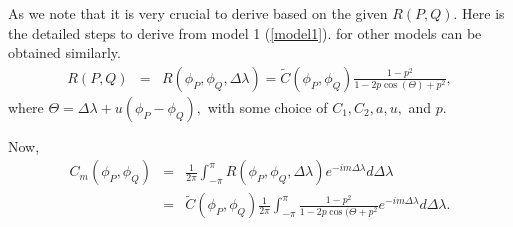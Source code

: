 
%
%

As we note that it is very crucial to derive \Cm based on the given $R(P,Q)$. Here is the detailed steps to derive \Cm from model 1 (\ref{model1}). \Cm for other models can be obtained similarly. 
\begin{eqnarray*}
	R(P, Q) &=& R(\phi_P, \phi_Q, \Delta \lambda) = \tilde{C}(\phi_P, \phi_Q) \frac{1-p^2}{1 - 2p \cos(\Theta)+p^2},
\end{eqnarray*}
where $\Theta = \Delta \lambda + u(\phi_P - \phi_Q),$ with some choice of $C_1, C_2, a, u,$ and $p$.

Now,
\begin{eqnarray*}
	C_m(\phi_P, \phi_Q) &=& \frac{1}{2\pi} \int_{-\pi}^\pi R(\phi_P, \phi_Q, \Delta \lambda) e^{-im\Delta \lambda}d\Delta \lambda \\
	&=& \tilde{C}(\phi_P, \phi_Q) \frac{1}{2\pi}\int_{-\pi}^\pi \frac{1-p^2}{1 - 2p \cos(\Theta+p^2} e^{-im\Delta \lambda}d\Delta \lambda.
\end{eqnarray*}

